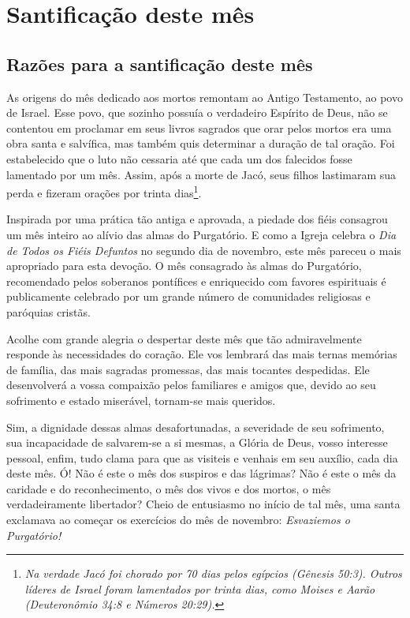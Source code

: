 \renewcommand{\thechapterdisplay}{Primeiro dia}
\renewcommand{\thechapterrunner}{Santificação deste mês}
\chapter[Primeiro dia --- Santificação deste mês]{Santificação deste mês}
\section*{Razões para a santificação deste mês}

As origens do mês dedicado aos mortos remontam ao Antigo Testamento, ao povo de Israel. Esse povo, que sozinho possuía o verdadeiro Espírito de Deus, não se contentou em proclamar em seus livros sagrados que orar pelos mortos era uma obra santa e salvífica, mas também quis determinar a duração de tal oração. Foi estabelecido que o luto não cessaria até que cada um dos falecidos fosse lamentado por um mês. Assim, após a morte de Jacó, seus filhos lastimaram sua perda e fizeram orações por trinta dias\footnote{\textit{Na verdade Jacó foi chorado por 70 dias pelos egípcios (Gênesis 50:3). Outros líderes de Israel foram lamentados por trinta dias, como Moises e Aarão (Deuteronômio 34:8 e Números 20:29).}}.

Inspirada por uma prática tão antiga e aprovada, a piedade dos fiéis consagrou um mês inteiro ao alívio das almas do Purgatório. E como a Igreja celebra o \textit{Dia de Todos os Fiéis Defuntos} no segundo dia de novembro, este mês pareceu o mais apropriado para esta devoção. O mês consagrado às almas do Purgatório, recomendado pelos soberanos pontífices e enriquecido com favores espirituais é publicamente celebrado por um grande número de comunidades religiosas e paróquias cristãs.

Acolhe com grande alegria o despertar deste mês que tão admiravelmente responde às necessidades do coração. Ele vos lembrará das mais ternas memórias de família, das mais sagradas promessas, das mais tocantes despedidas. Ele desenvolverá a vossa compaixão pelos familiares e amigos que, devido ao seu sofrimento e estado miserável, tornam-se mais queridos.

Sim, a dignidade dessas almas desafortunadas, a severidade de seu sofrimento, sua incapacidade de salvarem-se a si mesmas, a Glória de Deus, vosso interesse pessoal, enfim, tudo clama para que as visiteis e venhais em seu auxílio, cada dia deste mês. Ó! Não é este o mês dos suspiros e das lágrimas? Não é este o mês da caridade e do reconhecimento, o mês dos vivos e dos mortos, o mês verdadeiramente libertador? Cheio de entusiasmo no início de tal mês, uma santa exclamava ao começar os exercícios do mês de novembro: \textit{Esvaziemos o Purgatório!}

